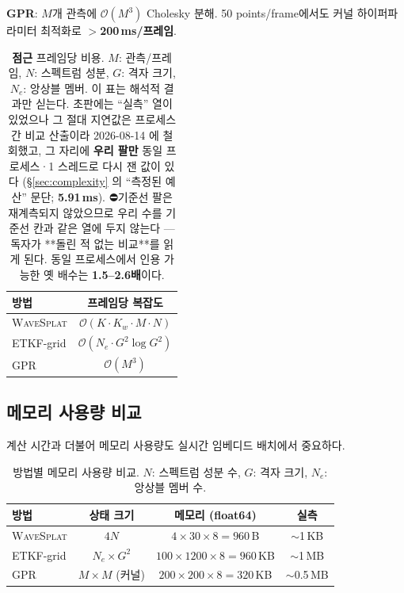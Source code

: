 \documentclass[11pt]{report}
\numberwithin{equation}{chapter}
\numberwithin{figure}{chapter}
\numberwithin{table}{chapter}
\newcommand{\WS}{\textsc{WaveSplat}}
\begin{document}
\textbf{GPR}: $M$개 관측에 $\mathcal{O}(M^3)$ Cholesky 분해.
50 points/frame에서도 커널 하이퍼파라미터 최적화로 \textbf{$>$200\,ms/프레임}.

\begin{table}[htbp]
\centering
\caption{\textbf{점근} 프레임당 비용. $M$: 관측/프레임, $N$: 스펙트럼 성분,
$G$: 격자 크기, $N_e$: 앙상블 멤버. 이 표는 해석적 결과만 싣는다.
초판에는 ``실측'' 열이 있었으나 그 절대 지연값은 프로세스 간 비교 산출이라 2026-08-14 에
철회했고, 그 자리에 \textbf{우리 팔만} 동일 프로세스·1 스레드로 다시 잰 값이 있다
(\S\ref{sec:complexity} 의 ``측정된 예산'' 문단; \textbf{5.91\,ms}).
⛔기준선 팔은 재계측되지 않았으므로 우리 수를 기준선 칸과 같은 열에 두지 않는다 ---
독자가 **돌린 적 없는 비교**를 읽게 된다. 동일 프로세스에서 인용 가능한 옛 배수는
\textbf{1.5--2.6배}이다.}
\label{tab:complexity}
\begin{tabular}{lc}
\toprule
방법 & 프레임당 복잡도 \\
\midrule
\WS{} & $\mathcal{O}(K \cdot K_w \cdot M \cdot N)$ \\
ETKF-grid & $\mathcal{O}(N_e \cdot G^2 \log G^2)$ \\
GPR       & $\mathcal{O}(M^3)$ \\
\bottomrule
\end{tabular}
\end{table}

\subsection{메모리 사용량 비교}
\label{sec:memory}

계산 시간과 더불어 메모리 사용량도 실시간 임베디드 배치에서 중요하다.

\begin{table}[htbp]
\centering
\caption{방법별 메모리 사용량 비교. $N$: 스펙트럼 성분 수,
$G$: 격자 크기, $N_e$: 앙상블 멤버 수.}
\label{tab:memory}
\begin{tabular}{lccc}
\toprule
방법 & 상태 크기 & 메모리 (float64) & 실측 \\
\midrule
\WS{} & $4N$ & $4 \times 30 \times 8 = 960$\,B & $\sim$1\,KB \\
ETKF-grid & $N_e \times G^2$ & $100 \times 1200 \times 8 = 960$\,KB & $\sim$1\,MB \\
GPR & $M \times M$ (커널) & $200 \times 200 \times 8 = 320$\,KB & $\sim$0.5\,MB \\
\bottomrule
\end{tabular}
\end{table}
\end{document}
